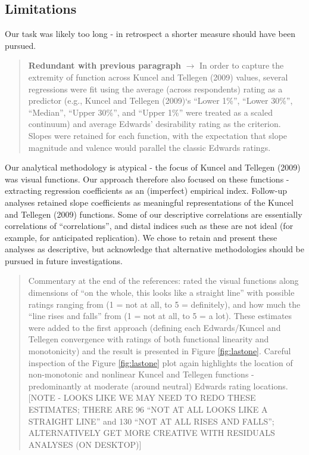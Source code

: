 \documentclass[
  ,jou]{apa6}
\begin{document}
\subsection{Limitations}\label{limitations}

Our task was likely too long - in retrospect a shorter measure should have been pursued.

\begin{quote}
\textbf{Redundant with previous paragraph} \(\rightarrow\) In order to capture the extremity of function across Kuncel and Tellegen (2009) values, several regressions were fit using the average (across respondents) rating as a predictor (e.g., Kuncel and Tellegen (2009)`s ``Lower 1\%'', ``Lower 30\%'', ``Median'', ``Upper 30\%'', and ``Upper 1\%'' were treated as a scaled continuum) and average Edwards' desirability rating as the criterion. Slopes were retained for each function, with the expectation that slope magnitude and valence would parallel the classic Edwards ratings.
\end{quote}

Our analytical methodology is atypical - the focus of Kuncel and Tellegen (2009) was visual functions. Our approach therefore also focused on these functions - extracting regression coefficients as an (imperfect) empirical index. Follow-up analyses retained slope coefficients as meaningful representations of the Kuncel and Tellegen (2009) functions. Some of our descriptive correlations are essentially correlations of ``correlations'', and distal indices such as these are not ideal (for example, for anticipated replication). We chose to retain and present these analyses as descriptive, but acknowledge that alternative methodologies should be pursued in future investigations.

\begin{quote}
Commentary at the end of the references: rated the visual functions along dimensions of ``on the whole, this looks like a straight line'' with possible ratings ranging from (1 = not at all, to 5 = definitely), and how much the ``line rises and falls'' from (1 = not at all, to 5 = a lot). These estimates were added to the first approach (defining each Edwards/Kuncel and Tellegen convergence with ratings of both functional linearity and monotonicity) and the result is presented in Figure \ref{fig:lastone}. Careful inspection of the Figure \ref{fig:lastone} plot again highlights the location of non-monotonic and nonlinear Kuncel and Tellegen functions - predominantly at moderate (around neutral) Edwards rating locations. {[}NOTE - LOOKS LIKE WE MAY NEED TO REDO THESE ESTIMATES; THERE ARE 96 ``NOT AT ALL LOOKS LIKE A STRAIGHT LINE'' and 130 ``NOT AT ALL RISES AND FALLS''; ALTERNATIVELY GET MORE CREATIVE WITH RESIDUALS ANALYSES (ON DESKTOP){]}
\end{quote}
\end{document}
